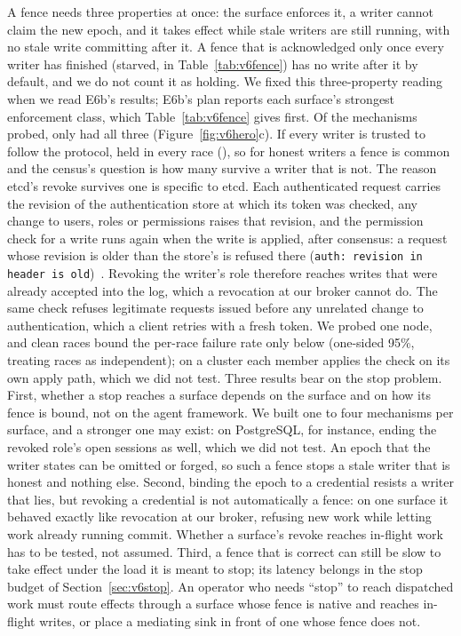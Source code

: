  A fence needs three properties at once: the surface enforces it, a writer cannot claim the new epoch,
and it takes effect while stale writers are still running, with no stale write committing after it. A fence that is
acknowledged only once every writer has finished (starved, in Table~\ref{tab:v6fence}) has no write after it by
default, and we do not count it as holding. We fixed this three-property reading when we read E6b's results; E6b's
plan reports each surface's strongest enforcement class, which Table~\ref{tab:v6fence} gives first. Of the \vsixFenceMechanisms{} mechanisms probed, only \vsixFenceAllThree{} had all
three (Figure~\ref{fig:v6hero}c). If every writer is trusted to follow the protocol, \vsixFenceHeldCount{} held in every
race (\vsixFenceHeldList), so for honest writers a fence is common and the census's question is how many survive a
writer that is not. The reason etcd's revoke survives one is specific to etcd. Each authenticated request carries the revision
of the authentication store at which its token was checked, any change to users, roles or permissions raises that
revision, and
the permission check for a write runs again when the write is applied, after consensus: a request whose revision is
older than the store's is refused there (\texttt{auth: revision in header is old})~\cite{etcdauth}. Revoking the
writer's role therefore reaches writes that were already accepted into the log, which a revocation at our broker
cannot do. The same check refuses legitimate requests issued before any unrelated change to authentication, which a
client retries with a fresh token. We probed one node, and \vsixFenceAllThreeRaces{} clean races bound the per-race
failure rate only below \vsixFenceRaceBound{} (one-sided 95\%, treating races as independent); on a cluster each member applies the check on its own
apply path, which we did not test. Three results bear on the stop problem. First, whether a stop reaches a surface depends on the surface and on
how its fence is bound, not on the agent framework. We built one to four mechanisms per surface, and a stronger one may
exist: on PostgreSQL, for instance, ending the revoked role's open sessions as well, which we did not test. An epoch that the writer states can be omitted or forged, so such a
fence stops a stale writer that is honest and nothing else. Second, binding the epoch to a credential resists a writer
that lies, but revoking a credential is not automatically a fence: on one surface it behaved exactly like revocation at
our broker, refusing new work while letting work already running commit. Whether a surface's revoke reaches in-flight
work has to be tested, not assumed. Third, a fence that is correct can still be slow to take effect under the load it is
meant to stop; its latency belongs in the stop budget of Section~\ref{sec:v6stop}. An operator who needs ``stop'' to
reach dispatched work must route effects through a surface whose fence is native and reaches in-flight writes, or place
a mediating sink in front of one whose fence does not.

